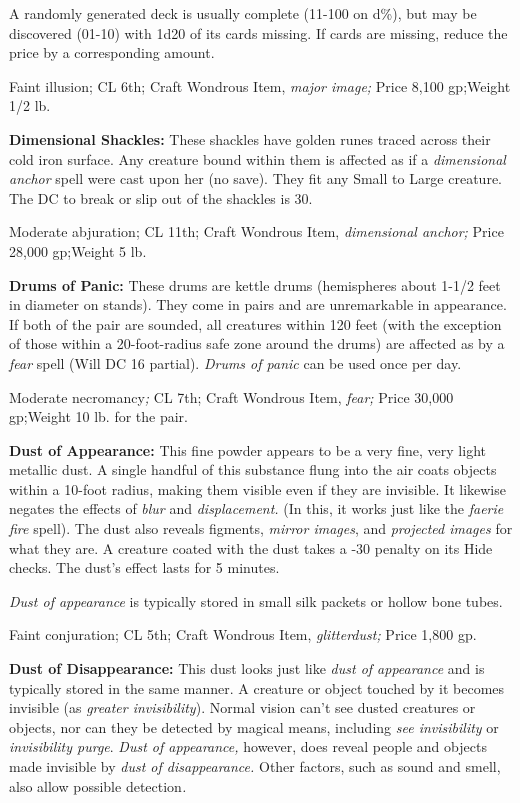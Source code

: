 \documentclass{article}
\begin{document}
A randomly generated deck is usually complete (11-100 on d\%), but may be discovered 
(01-10) with 1d20 of its cards missing. If cards are missing, reduce the price 
by a corresponding amount.

Faint illusion; CL 6th; Craft Wondrous Item, \textit{major image; }Price 8,100 
gp;Weight 1/2 lb.

\textbf{Dimensional Shackles:} These shackles have golden runes traced across their 
cold iron surface. Any creature bound within them is affected as if a \textit{dimensional 
anchor }spell were cast upon her (no save). They fit any Small to Large creature. 
The DC to break or slip out of the shackles is 30.

Moderate abjuration; CL 11th; Craft Wondrous Item, \textit{dimensional anchor; 
}Price 28,000 gp;Weight 5 lb.

\textbf{Drums of Panic: }These drums are kettle drums (hemispheres about 1-1/2 
feet in diameter on stands). They come in pairs and are unremarkable in appearance. 
If both of the pair are sounded, all creatures within 120 feet (with the exception 
of those within a 20-foot-radius safe zone around the drums) are affected as by 
a \textit{fear }spell (Will DC 16 partial). \textit{Drums of panic }can be used 
once per day.

Moderate necromancy\textit{; }CL 7th; Craft Wondrous Item, \textit{fear; }Price 
30,000 gp;Weight 10 lb. for the pair.

\textbf{Dust of Appearance:} This fine powder appears to be a very fine, very light 
metallic dust. A single handful of this substance flung into the air coats objects 
within a 10-foot radius, making them visible even if they are invisible. It likewise 
negates the effects of \textit{blur }and \textit{displacement. }(In this, it works 
just like the \textit{faerie fire }spell). The dust also reveals figments, \textit{mirror 
images}, and \textit{projected images }for what they are. A creature coated with 
the dust takes a -30 penalty on its Hide checks. The dust's effect lasts for 5 
minutes.

\textit{Dust of appearance }is typically stored in small silk packets or hollow 
bone tubes.

Faint conjuration; CL 5th; Craft Wondrous Item, \textit{glitterdust; }Price 1,800 
gp.

\textbf{Dust of Disappearance:} This dust looks just like \textit{dust of appearance 
}and is typically stored in the same manner. A creature or object touched by it 
becomes invisible (as \textit{greater invisibility}). Normal vision can't see dusted 
creatures or objects, nor can they be detected by magical means, including \textit{see 
invisibility }or \textit{invisibility purge}. \textit{Dust of appearance, }however, 
does reveal people and objects made invisible by \textit{dust of disappearance. 
}Other factors, such as sound and smell, also allow possible detection\textit{.}
\end{document}
